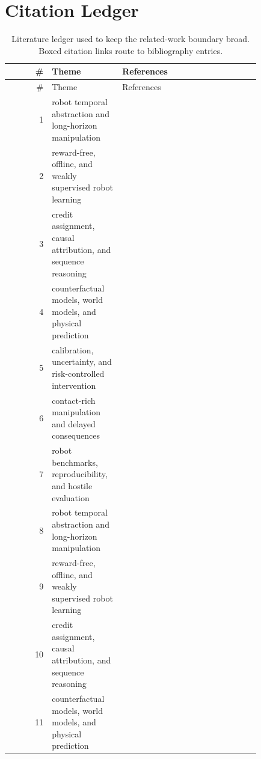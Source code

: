 \documentclass{article}
\begin{document}
\section{Citation Ledger}
\begin{longtable}{@{}r p{0.28\linewidth} p{0.55\linewidth}@{}}
\caption{Literature ledger used to keep the related-work boundary broad. Boxed citation links route to bibliography entries.}\\
\toprule
\# & Theme & References\\
\midrule
\endfirsthead
\toprule
\# & Theme & References\\
\midrule
\endhead
1 & robot temporal abstraction and long-horizon manipulation & \citep{zhang2025compliant1,chen2025robohorizon2,matthew2020multistage3} \\
2 & reward-free, offline, and weakly supervised robot learning & \citep{liu2026sthadp4,wang2022learning5,hu2026recovla6} \\
3 & credit assignment, causal attribution, and sequence reasoning & \citep{zhang2025dthrl7,sui2026hierarchical8,yao2025pickandplace9} \\
4 & counterfactual models, world models, and physical prediction & \citep{wu2026pact10,tcheurekdjian2025opal11,chen2026manipulationnet12} \\
5 & calibration, uncertainty, and risk-controlled intervention & \citep{zhang2025llms13,peng2026bicoord14,wu2022learning15} \\
6 & contact-rich manipulation and delayed consequences & \citep{gonzalezfierro2014fullbody16,han2024learning17,zhou2025methodology18} \\
7 & robot benchmarks, reproducibility, and hostile evaluation & \citep{zhang2025lhmhumanoid19,min2026tactileproprioceptive20,cai2021safetycritical21} \\
8 & robot temporal abstraction and long-horizon manipulation & \citep{chebotar2021actionable22,huang2026neurosymbolic23,kuang2025skillblender24} \\
9 & reward-free, offline, and weakly supervised robot learning & \citep{heuthe2024counterfactual25,ran2024taskoriented26,kim2026hierarchical27} \\
10 & credit assignment, causal attribution, and sequence reasoning & \citep{wu2021a28,kalluraya2024minimumviolation29,ploeger2020high30} \\
11 & counterfactual models, world models, and physical prediction & \citep{mishra2023generative31,gao2025must32,antonyshyn2024deep33} \\

\end{longtable}
\end{document}

